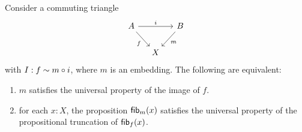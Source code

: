 \begin{thm}
Consider a commuting triangle
\begin{equation*}
\begin{tikzcd}[column sep=small]
A \arrow[rr,"i"] \arrow[dr,swap,"f"] & & B \arrow[dl,"m"] \\
& X
\end{tikzcd}
\end{equation*}
with $I:f\sim m\circ i$, where $m$ is an embedding. The following are equivalent:
\begin{enumerate}
\item $m$ satisfies the universal property of the image of $f$.
\item for each $x:X$, the proposition $\mathsf{fib}_{m}(x)$ satisfies the universal property of the propositional truncation of $\mathsf{fib}_{f}(x)$.
\end{enumerate}
\end{thm}
